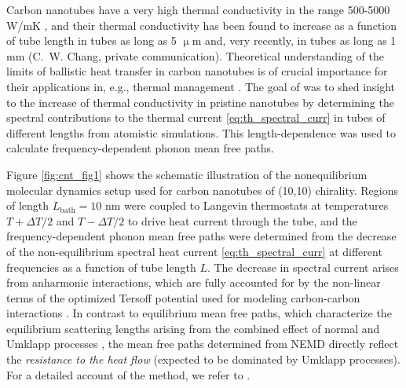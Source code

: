 Carbon nanotubes have a very high thermal conductivity in the range 500-5000 W/mK \cite{}, and their thermal conductivity has been found to increase as a function of tube length in tubes as long as 5 $\upmu$m and, very recently, in tubes as long as 1 mm (C.~W. Chang, private communication). Theoretical understanding of the limits of ballistic heat transfer in carbon nanotubes is of crucial importance for their applications in, e.g., thermal management \cite{}. The goal of  was to shed insight to the increase of thermal conductivity in pristine nanotubes by determining the spectral contributions to the thermal current \eqref{eq:th_spectral_curr} in tubes of different lengths from atomistic simulations. This length-dependence was used to calculate frequency-dependent phonon mean free paths. %

Figure \ref{fig:cnt_fig1} shows the schematic illustration of the nonequilibrium molecular dynamics setup used for carbon nanotubes of (10,10) chirality. Regions of length $L_{\textrm{bath}}=10$ nm were coupled to Langevin thermostats at temperatures $T+\Delta T/2$ and $T-\Delta T/2$ to drive heat current through the tube, and the frequency-dependent phonon mean free paths were determined from the decrease of the non-equilibrium spectral heat current \eqref{eq:th_spectral_curr} at different frequencies as a function of tube length $L$. The decrease in spectral current arises from anharmonic interactions, which are fully accounted for by the non-linear terms of the optimized Tersoff potential used for modeling carbon-carbon interactions \cite{tersoff88a,lindsay10}. In contrast to equilibrium mean free paths, which characterize the equilibrium scattering lengths arising from the combined effect of normal and Umklapp processes \cite{mcgaughey04}, the mean free paths determined from NEMD directly reflect the \textit{resistance to the heat flow} (expected to be dominated by Umklapp processes). For a detailed account of the method, we refer to .


